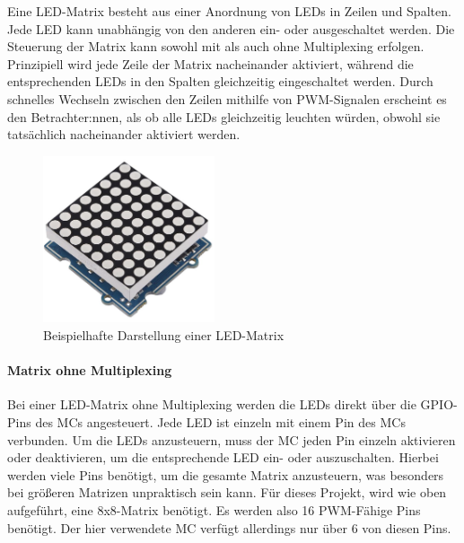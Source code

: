 Eine LED-Matrix besteht aus einer Anordnung von LEDs in Zeilen und Spalten.
Jede LED kann unabhängig von den anderen ein- oder ausgeschaltet werden.
Die Steuerung der Matrix kann sowohl mit als auch ohne Multiplexing erfolgen.
Prinzipiell wird jede Zeile der Matrix nacheinander aktiviert, während die
entsprechenden LEDs in den Spalten gleichzeitig eingeschaltet werden.
Durch schnelles Wechseln zwischen den Zeilen mithilfe von \ac{PWM}-Signalen erscheint es den Betrachter:nnen, als ob alle LEDs
gleichzeitig leuchten würden, obwohl sie tatsächlich nacheinander aktiviert werden.

\begin{figure}[htbp] %
	\centering
	\includegraphics[width=0.45\textwidth]{img/LED-Matrix}
	\caption{Beispielhafte Darstellung einer LED-Matrix}
	\label{img:LED-Matrix}
\end{figure}

\paragraph{Matrix ohne Multiplexing}

Bei einer LED-Matrix ohne Multiplexing werden die LEDs direkt über die \ac{GPIO}-Pins des
\ac{MC}s angesteuert. Jede LED ist einzeln mit einem Pin des \ac{MC}s verbunden. Um die LEDs anzusteuern,
muss der \ac{MC} jeden Pin einzeln aktivieren oder deaktivieren, um die entsprechende LED ein- oder auszuschalten.
Hierbei werden viele Pins benötigt, um die gesamte Matrix anzusteuern, was besonders bei größeren Matrizen unpraktisch
sein kann. Für dieses Projekt, wird wie oben aufgeführt, eine 8x8-Matrix benötigt. Es werden also 16 PWM-Fähige Pins
benötigt. Der hier verwendete \ac{MC} verfügt allerdings nur über 6 von diesen Pins.

